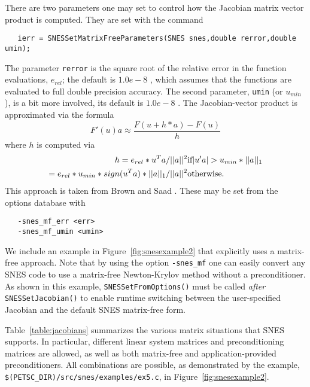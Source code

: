 There are two parameters one may set to control how the Jacobian matrix vector
product is computed. They are set with the command
\begin{verbatim}
   ierr = SNESSetMatrixFreeParameters(SNES snes,double rerror,double umin);
\end{verbatim}
The parameter {\tt rerror} is the square root of the 
relative error in the function evaluations, $e_{rel}$; the default is $ 1.0e-8 $ , which assumes
that the functions are evaluated to full double precision accuracy. The 
second parameter, {\tt umin} (or $u_{min}$), is a bit more involved, its default is 
$ 1.0e-8 $ . The Jacobian-vector product is approximated via the formula
\[
    F'(u) a \approx \frac{F(u + h*a) - F(u)}{h}
\]
where $ h $ is computed via 
\begin{eqnarray*}
        h = e_{rel}*u^{T}a/||a||^2                       &    \hbox{if}  |u'a| > u_{min}*||a||_{1} \\
          = e_{rel}*u_{min}*sign(u^{T}a)*||a||_{1}/||a||^2  &    \hbox{otherwise}.
\end{eqnarray*}
This approach is taken from Brown and Saad \cite{brownsaad:90}.
These may be set from the options database with 
\begin{verbatim}
   -snes_mf_err <err>
   -snes_mf_umin <umin>
\end{verbatim}
 

We include an example in Figure~\ref{fig:snesexample2} that explicitly
uses a matrix-free approach.  Note that by using the option 
{\tt -snes\_mf} one can easily convert any SNES code to use a matrix-free
Newton-Krylov method without a preconditioner.  As shown in this
example, {\tt SNESSetFromOptions()} must be called {\em after}
{\tt SNESSetJacobian()} to enable runtime switching between the
user-specified Jacobian and the default SNES matrix-free form.

Table~\ref{table:jacobians} summarizes the various matrix situations
that SNES supports.  In particular, different linear system matrices
and preconditioning matrices are allowed, as well as both matrix-free
and application-provided preconditioners.  All combinations are
possible, as demonstrated by the example, 
{\tt \$(PETSC\_DIR)/src/snes/\-examples/ex5.c},
 in Figure~\ref{fig:snesexample2}.

